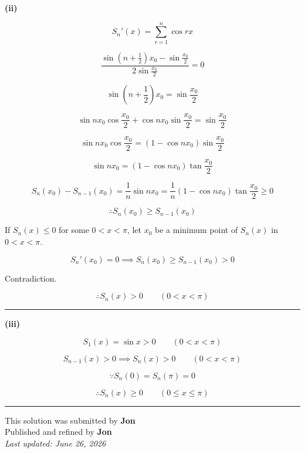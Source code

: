 \documentclass[12pt]{article}
\begin{document}
\textbf{(ii)}

$$S_n'(x)=\sum_{r=1}^{n}\cos rx$$

$$\frac{\sin\left(n+\frac12\right)x_0-\sin\frac{x_0}{2}}{2\sin\frac{x_0}{2}}=0$$

$$\sin\left(n+\frac12\right)x_0=\sin\frac{x_0}{2}$$

$$\sin nx_0\cos\frac{x_0}{2}+\cos nx_0\sin\frac{x_0}{2}=\sin\frac{x_0}{2}$$

$$\sin nx_0\cos\frac{x_0}{2}=(1-\cos nx_0)\sin\frac{x_0}{2}$$

$$\sin nx_0=(1-\cos nx_0)\tan\frac{x_0}{2}$$

$$S_n(x_0)-S_{n-1}(x_0)=\frac1n\sin nx_0=\frac1n(1-\cos nx_0)\tan\frac{x_0}{2}\ge0$$

$$\therefore S_n(x_0)\ge S_{n-1}(x_0)$$

If $S_n(x)\le0$ for some $0<x<\pi$, let $x_0$ be a minimum point of $S_n(x)$ in $0<x<\pi$.

$$S_n'(x_0)=0 \implies S_n(x_0)\ge S_{n-1}(x_0)>0$$

Contradiction.

$$\therefore S_n(x)>0\qquad (0<x<\pi)$$

\bigskip\hrule\bigskip

\textbf{(iii)}

$$S_1(x)=\sin x>0\qquad (0<x<\pi)$$

$$S_{n-1}(x)>0\implies S_n(x)>0\qquad (0<x<\pi)$$

$$\because S_n(0)=S_n(\pi)=0$$

$$\therefore S_n(x)\ge0\qquad (0\le x\le\pi)$$

\bigskip
\hrule
\begin{center}
This solution was submitted by \textbf{Jon}\\[4pt]
Published and refined by \textbf{Jon}\\[8pt]
\textit{Last updated: June 26, 2026}
\end{center}
\end{document}
